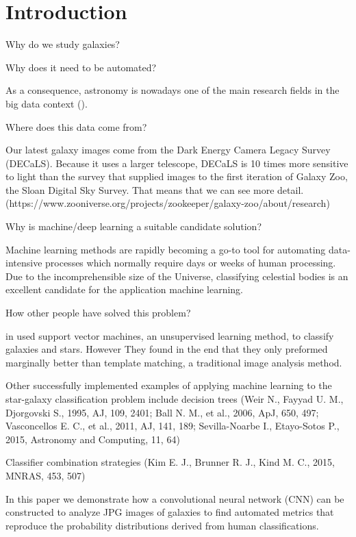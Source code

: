 \section{Introduction}

Why do we study galaxies?

Why does it need to be automated?

As a consequence, astronomy is nowadays one of the main research fields in the big data context (\citeauthor{microsoft-galaxies}).

Where does this data come from?

Our latest galaxy images come from the Dark Energy Camera Legacy Survey (DECaLS). Because it uses a larger telescope, DECaLS is 10 times more sensitive to light than the survey that supplied images to the first iteration of Galaxy Zoo, the Sloan Digital Sky Survey. That means that we can see more detail. (https://www.zooniverse.org/projects/zookeeper/galaxy-zoo/about/research)

Why is machine/deep learning a suitable candidate solution?

Machine learning methods are rapidly becoming a go-to tool for automating data-intensive processes which normally require days or weeks of human processing. Due to the incomprehensible size of the Universe, classifying celestial bodies is an excellent candidate for the application machine learning.


How other people have solved this problem?

\citeauthor{svn-galaxy} in \citeyear{svn-galaxy} used support vector machines, an unsupervised learning method, to classify galaxies and stars. However They found in the end that they only preformed marginally better than template matching, a traditional image analysis method.

Other successfully implemented examples of applying machine learning to the star-galaxy classification problem include decision trees (Weir N., Fayyad U. M., Djorgovski S., 1995, AJ, 109, 2401; Ball N. M., et al., 2006, ApJ, 650, 497; Vasconcellos E. C., et al., 2011, AJ, 141, 189; Sevilla-Noarbe I., Etayo-Sotos P., 2015, Astronomy and Computing, 11, 64)

Classifier combination strategies (Kim E. J., Brunner R. J., Kind M. C., 2015, MNRAS, 453, 507)

In this paper we demonstrate how a convolutional neural network (CNN) can be constructed to analyze JPG images of galaxies to find automated metrics that reproduce the probability distributions derived from human classifications.
